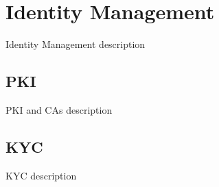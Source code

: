 \newpage
\section{Identity Management}
Identity Management description

\subsection{PKI}
PKI and CAs description

\subsection{KYC}
KYC description